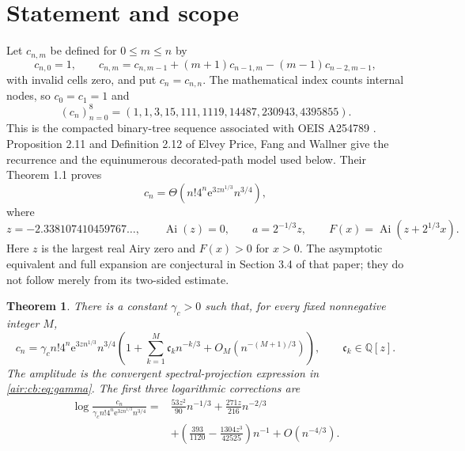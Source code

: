 \documentclass[11pt,letterpaper]{article}
\numberwithin{equation}{section}
\newtheorem{theorem}{Theorem}[section]
\theoremstyle{remark}
\newcommand{\Ai}{\operatorname{Ai}}
\newcommand{\Q}{\mathbb{Q}}
\newcommand{\ee}{\mathrm e}
\begin{document}
\section{Statement and scope}\label{air:cb:sec:statement}

Let $c_{n,m}$ be defined for $0\le m\le n$ by
\begin{equation}\label{air:cb:eq:count}
c_{n,0}=1,\qquad
c_{n,m}=c_{n,m-1}+(m+1)c_{n-1,m}-(m-1)c_{n-2,m-1},
\end{equation}
with invalid cells zero, and put $c_n=c_{n,n}$. The mathematical index counts
internal nodes, so $c_0=c_1=1$ and
\[
(c_n)_{n=0}^{8}=(1,1,3,15,111,1119,14487,230943,4395855).
\]
This is the compacted binary-tree sequence associated with OEIS A254789
\cite{oeis}. Proposition 2.11 and Definition 2.12 of Elvey Price, Fang and
Wallner \cite{epfw} give the recurrence and the equinumerous decorated-path
model used below. Their Theorem 1.1 proves
\begin{equation}\label{air:cb:eq:known-theta}
c_n=\Theta\!\left(n!4^n\ee^{3zn^{1/3}}n^{3/4}\right),
\end{equation}
where
\[
z=-2.338107410459767\ldots,\qquad
\Ai(z)=0,\qquad a=2^{-1/3}z,\qquad
F(x)=\Ai(z+2^{1/3}x).
\]
Here $z$ is the largest real Airy zero and $F(x)>0$ for $x>0$.
The asymptotic equivalent and full expansion are conjectural in Section 3.4
of that paper; they do not follow merely from its two-sided estimate.

\begin{theorem}\label{air:cb:thm:main}
There is a constant $\gamma_c>0$ such that, for every fixed nonnegative
integer $M$,
\begin{equation}\label{air:cb:eq:main}
c_n=\gamma_c n!4^n\ee^{3zn^{1/3}}n^{3/4}
\left(1+\sum_{k=1}^{M}\mathfrak c_k n^{-k/3}
+O_M(n^{-(M+1)/3})\right),\qquad \mathfrak c_k\in\Q[z].
\end{equation}
The amplitude is the convergent spectral-projection expression in
\eqref{air:cb:eq:gamma}. The first three logarithmic corrections are
\begin{equation}\label{air:cb:eq:log-corrections}
\begin{aligned}
\log\frac{c_n}{\gamma_c n!4^n\ee^{3zn^{1/3}}n^{3/4}}
={}&\frac{53z^2}{90}n^{-1/3}+\frac{271z}{216}n^{-2/3}\\
&+\left(\frac{393}{1120}-\frac{1304z^3}{42525}\right)n^{-1}
+O(n^{-4/3}).
\end{aligned}
\end{equation}
\end{theorem}
\end{document}
